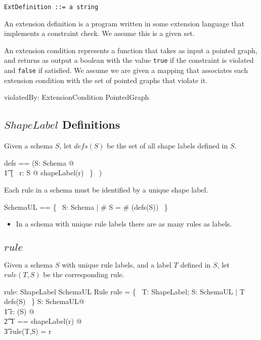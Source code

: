 \documentclass{article}
\begin{document}
\begin{verbatim}
ExtDefinition ::= a string
\end{verbatim}

An extension definition is a program written in some extension language that implements a constraint check.
We assume this is a given set.
\begin{zed}
	[ExtDefinition]
\end{zed}

An extension condition represents a function that takes as input a pointed graph, and returns
as output a boolean with the value {\tt true} if the constraint is violated and {\tt false} if satisfied.
We assume we are given a mapping that associates each extension condition with the set of pointed graphs that violate it.
\begin{axdef}
	violatedBy: ExtensionCondition \fun \power PointedGraph
\end{axdef}

\subsection{$ShapeLabel$ Definitions}
Given a schema $S$, let $defs(S)$ be the set of all shape labels defined in $S$.
\begin{zed}
	defs == (\lambda S: Schema @ \\
\t1		\{~ r: \ran S @ shapeLabel(r) ~\} ~)
\end{zed}
 
Each rule in a schema must be identified by a unique shape label.
\begin{zed}
	SchemaUL == \{~ S: Schema | \# S = \# (defs(S)) ~\}
\end{zed}
\begin{itemize}
\item In a schema with unique rule labels there are as many rules as labels.
\end{itemize}

\subsection{$rule$}
Given a schema $S$ with unique rule labels, and a label $T$ defined in $S$, let $rule(T,S)$ be the corresponding rule.
\begin{axdef}
	rule: ShapeLabel \cross SchemaUL \pfun Rule
\where
	\dom rule = \{~ T: ShapeLabel; S: SchemaUL | T \in defs(S) ~\}
\also
	\forall S: SchemaUL@\\
\t1		\forall r: \ran(S) @ \\
\t2			\LET T == shapeLabel(r) @ \\
\t3				rule(T,S) = r
\end{axdef}
\end{document}
